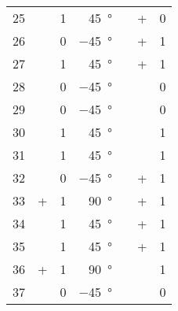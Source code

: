 \begin{longtable}[c]{rccrccc}
	25\hspace{1.5em} & \times & 1 & \qty{ 45}{\degree}\hspace{1.5em} &  &      + & 0 \\
	26\hspace{1.5em} & \times & 0 & \qty{-45}{\degree}\hspace{1.5em} &  &      + & 1 \\
	27\hspace{1.5em} & \times & 1 & \qty{ 45}{\degree}\hspace{1.5em} &  &      + & 1 \\
	28\hspace{1.5em} & \times & 0 & \qty{-45}{\degree}\hspace{1.5em} &  & \times & 0 \\
	29\hspace{1.5em} & \times & 0 & \qty{-45}{\degree}\hspace{1.5em} &  & \times & 0 \\
	30\hspace{1.5em} & \times & 1 & \qty{ 45}{\degree}\hspace{1.5em} &  & \times & 1 \\
	31\hspace{1.5em} & \times & 1 & \qty{ 45}{\degree}\hspace{1.5em} &  & \times & 1 \\
	32\hspace{1.5em} & \times & 0 & \qty{-45}{\degree}\hspace{1.5em} &  &      + & 1 \\
	33\hspace{1.5em} &      + & 1 & \qty{ 90}{\degree}\hspace{1.5em} &  &      + & 1 \\
	34\hspace{1.5em} & \times & 1 & \qty{ 45}{\degree}\hspace{1.5em} &  &      + & 1 \\
	35\hspace{1.5em} & \times & 1 & \qty{ 45}{\degree}\hspace{1.5em} &  &      + & 1 \\
	36\hspace{1.5em} &      + & 1 & \qty{ 90}{\degree}\hspace{1.5em} &  & \times & 1 \\
	37\hspace{1.5em} & \times & 0 & \qty{-45}{\degree}\hspace{1.5em} &  & \times & 0 \\

\end{longtable}
